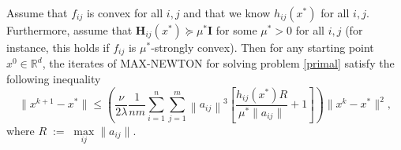 \documentclass[10pt]{article}
\newcommand{\eqdef}{\; { := }\;}
\newcommand{\R}{\mathbb{R}}
\newcommand{\newalpha}{h}
\newcommand{\mH}{\mathbf{H}}
\newcommand{\mI}{\mathbf{I}}
\begin{document}
\begin{theorem}\label{th:maxnewton}
	Assume that $f_{ij}$ is convex for all $i,j$ and that we know  $\newalpha_{ij}(x^*)$ for all $i,j$. Furthermore, assume that $\mH_{ij}(x^*) \succeq \mu^* \mI$ for some $\mu^*>0$ for all $i,j$ (for instance, this holds if $f_{ij}$ is $\mu^*$-strongly convex). Then for any starting point $x^0 \in \R^d$, the iterates of {\sf MAX-NEWTON} for solving problem \eqref{primal} satisfy the following inequality
	$$
	\|x^{k+1}-x^*\| \leq  \left(\frac{\nu}{2\lambda} \frac{1}{nm}\sum\limits_{i=1}^n\sum\limits_{j=1}^m\left\|a_{ij}\right\|^3\left[\frac{\newalpha_{ij}(x^*)R}{\mu^*\|a_{ij}\|}+ 1\right] \right) \|x^k-x^*\|^2,
	$$
	where $R\eqdef \max\limits_{ij}\|a_{ij}\|$.
\end{theorem}
\end{document}
